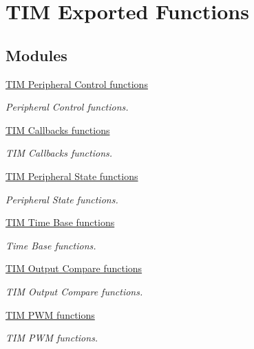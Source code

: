 \hypertarget{group___t_i_m___exported___functions}{}\section{T\+IM Exported Functions}
\label{group___t_i_m___exported___functions}
\subsection*{Modules}
\begin{DoxyCompactItemize}
\item 
\hyperlink{group___t_i_m___exported___functions___group8}{T\+I\+M Peripheral Control functions}
\begin{DoxyCompactList}\small\item\em Peripheral Control functions. \end{DoxyCompactList}\item 
\hyperlink{group___t_i_m___exported___functions___group9}{T\+I\+M Callbacks functions}
\begin{DoxyCompactList}\small\item\em T\+IM Callbacks functions. \end{DoxyCompactList}\item 
\hyperlink{group___t_i_m___exported___functions___group10}{T\+I\+M Peripheral State functions}
\begin{DoxyCompactList}\small\item\em Peripheral State functions. \end{DoxyCompactList}\item 
\hyperlink{group___t_i_m___exported___functions___group1}{T\+I\+M Time Base functions}
\begin{DoxyCompactList}\small\item\em Time Base functions. \end{DoxyCompactList}\item 
\hyperlink{group___t_i_m___exported___functions___group2}{T\+I\+M Output Compare functions}
\begin{DoxyCompactList}\small\item\em T\+IM Output Compare functions. \end{DoxyCompactList}\item 
\hyperlink{group___t_i_m___exported___functions___group3}{T\+I\+M P\+W\+M functions}
\begin{DoxyCompactList}\small\item\em T\+IM P\+WM functions. \end{DoxyCompactList}\item 

\end{DoxyCompactItemize}
